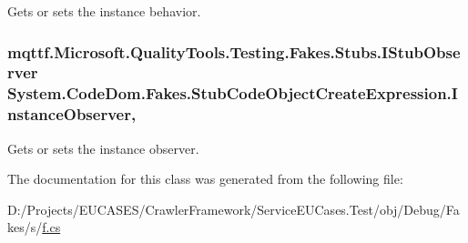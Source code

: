 Gets or sets the instance behavior.

\hypertarget{class_system_1_1_code_dom_1_1_fakes_1_1_stub_code_object_create_expression_a5bc5f4d5b45a4ce5ea35da2b6e0f2ab7}{
\subsubsection[{Instance\-Observer}]{\setlength{\rightskip}{0pt plus 5cm}mqttf.\-Microsoft.\-Quality\-Tools.\-Testing.\-Fakes.\-Stubs.\-I\-Stub\-Observer System.\-Code\-Dom.\-Fakes.\-Stub\-Code\-Object\-Create\-Expression.\-Instance\-Observer\hspace{0.3cm}{\ttfamily [get]}, {\ttfamily [set]}}}\label{class_system_1_1_code_dom_1_1_fakes_1_1_stub_code_object_create_expression_a5bc5f4d5b45a4ce5ea35da2b6e0f2ab7}


Gets or sets the instance observer.



The documentation for this class was generated from the following file\-:\begin{DoxyCompactItemize}
\item 
D\-:/\-Projects/\-E\-U\-C\-A\-S\-E\-S/\-Crawler\-Framework/\-Service\-E\-U\-Cases.\-Test/obj/\-Debug/\-Fakes/s/\hyperlink{s_2f_8cs}{f.\-cs}\end{DoxyCompactItemize}
